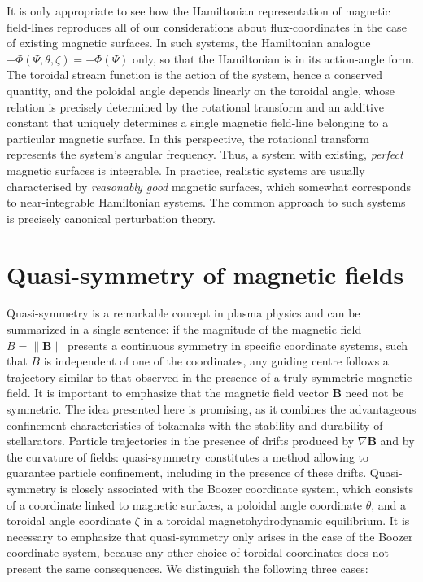 \quad It is only appropriate to see how the Hamiltonian representation of magnetic field-lines reproduces all of our considerations about flux-coordinates in the case of existing magnetic surfaces. In such systems, the Hamiltonian analogue $-\Phi(\Psi,\theta,\zeta)=-\Phi(\Psi)$ only, so that the Hamiltonian is in its action-angle form. The toroidal stream function is the action of the system, hence a conserved quantity, and the poloidal angle depends linearly on the toroidal angle, whose relation is precisely determined by the rotational transform and an additive constant that uniquely determines a single magnetic field-line belonging to a particular magnetic surface. In this perspective, the rotational transform represents the system's angular frequency. Thus, a system with existing, \textit{perfect} magnetic surfaces is integrable. In practice, realistic systems are usually characterised by \textit{reasonably good} magnetic surfaces, which somewhat corresponds to near-integrable Hamiltonian systems. The common approach to such systems is precisely canonical perturbation theory.

\section{Quasi-symmetry of magnetic fields}

Quasi-symmetry is a remarkable concept in plasma physics and can be summarized in a single sentence: if the magnitude of the magnetic field $B=\|\mathbf{B}\|$ presents a continuous symmetry in specific coordinate systems, such that $B$ is independent of one of the coordinates, any guiding centre follows a trajectory similar to that observed in the presence of a truly symmetric magnetic field. It is important to emphasize that the magnetic field vector $\mathbf{B}$ need not be symmetric. The idea presented here is promising, as it combines the advantageous confinement characteristics of tokamaks with the stability and durability of stellarators. Particle trajectories in the presence of drifts produced by $\nabla\mathbf{B}$ and by the curvature of fields: quasi-symmetry constitutes a method allowing to guarantee particle confinement, including in the presence of these drifts. Quasi-symmetry is closely associated with the Boozer coordinate system, which consists of a coordinate linked to magnetic surfaces, a poloidal angle coordinate $\theta$, and a toroidal angle coordinate $\zeta$ in a toroidal magnetohydrodynamic equilibrium. It is necessary to emphasize that quasi-symmetry only arises in the case of the Boozer coordinate system, because any other choice of toroidal coordinates does not present the same consequences. We distinguish the following three cases:

